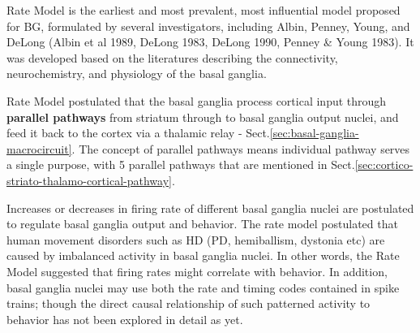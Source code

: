 Rate Model is the earliest and most prevalent, most influential model proposed
for BG, formulated by several investigators, including Albin, Penney, Young, and
DeLong (Albin et al 1989, DeLong 1983, DeLong 1990, Penney \& Young 1983).
It was developed based on the literatures describing the connectivity,
neurochemistry, and physiology of the basal ganglia.

\begin{mdframed}
Rate Model postulated that the basal ganglia process cortical input through
{\bf parallel pathways} from striatum through to basal ganglia output nuclei,
and feed it back to the cortex via a thalamic relay -
Sect.\ref{sec:basal-ganglia-macrocircuit}. The concept of parallel pathways
means individual pathway serves a single purpose, with 5 parallel pathways that are mentioned in
Sect.\ref{sec:cortico-striato-thalamo-cortical-pathway}.

Increases or decreases in firing rate of different basal ganglia nuclei are
postulated to regulate basal ganglia output and behavior.
The rate model postulated that human movement disorders such as HD (PD,
hemiballism, dystonia etc) are caused by imbalanced activity in basal ganglia
nuclei. In other words, the Rate Model suggested that firing rates might
correlate with behavior. In addition, basal ganglia nuclei may use both the rate
and timing codes contained in spike trains; though the direct causal
relationship of such patterned activity to behavior has not been explored in
detail as yet. 
\end{mdframed}

